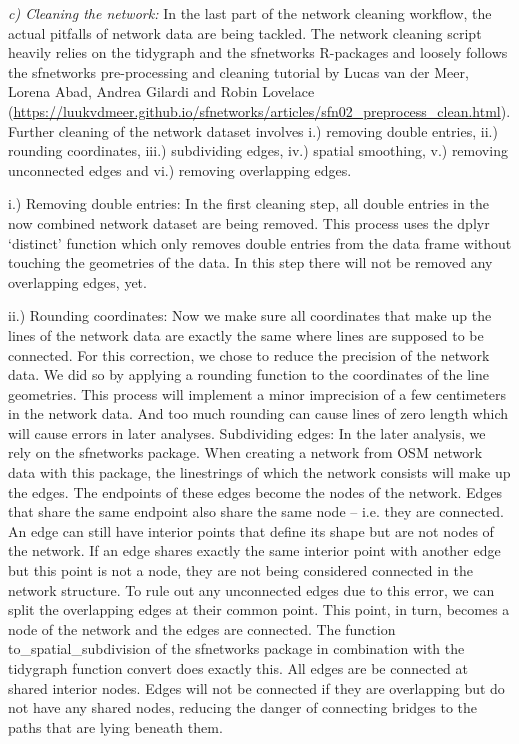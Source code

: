 \documentclass[10pt]{article}
\begin{document}
\textit{c) Cleaning the network:} In the last part of the network cleaning workflow, the actual pitfalls of network data are being tackled.
The network cleaning script heavily relies on the tidygraph and the sfnetworks R-packages and loosely follows the sfnetworks pre-processing and cleaning tutorial by Lucas van der Meer, Lorena Abad, Andrea Gilardi and Robin Lovelace (\url{https://luukvdmeer.github.io/sfnetworks/articles/sfn02_preprocess_clean.html}).
Further cleaning of the network dataset involves i.) removing double entries, ii.) rounding coordinates, iii.) subdividing edges, iv.) spatial smoothing, v.) removing unconnected edges and vi.) removing overlapping edges.

i.) Removing double entries: In the first cleaning step, all double entries in the now combined network dataset are being removed. This process uses the dplyr ‘distinct’ function which only removes double entries from the data frame without touching the geometries of the data. In this step there will not be removed any overlapping edges, yet.

ii.) Rounding coordinates: Now we make sure all coordinates that make up the lines of the network data are exactly the same where lines are supposed to be connected. For this correction, we chose to reduce the precision of the network data. We did so by applying a rounding function to the coordinates of the line geometries. This process will implement a minor imprecision of a few centimeters in the network data.  And too much rounding can cause lines of zero length which will cause errors in later analyses.
Subdividing edges: In the later analysis, we rely on the sfnetworks package. When creating a network from OSM network data with this package, the linestrings of which the network consists will make up the edges. The endpoints of these edges become the nodes of the network. Edges that share the same endpoint also share the same node – i.e. they are connected. An edge can still have interior points that define its shape but are not nodes of the network. If an edge shares exactly the same interior point with another edge but this point is not a node, they are not being considered connected in the network structure. To rule out any unconnected edges due to this error, we can split the overlapping edges at their common point. This point, in turn, becomes a node of the network and the edges are connected. The function to\_spatial\_subdivision of the sfnetworks package in combination with the tidygraph function convert does exactly this. All edges are be connected at shared interior nodes. Edges will not be connected if they are overlapping but do not have any shared nodes, reducing the danger of connecting bridges to the paths that are lying beneath them.
\end{document}
